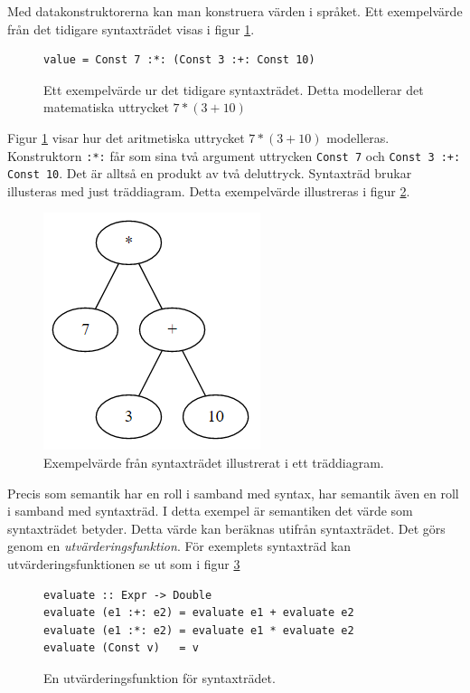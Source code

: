 \begin{draft}
Med datakonstruktorerna kan man konstruera värden i språket. Ett exempelvärde från det tidigare syntaxträdet visas i figur \ref{fig:syntax_exempel_varde}.

\begin{figure}[tph]
  \begin{lstlisting}
value = Const 7 :*: (Const 3 :+: Const 10)
  \end{lstlisting}
  \caption{Ett exempelvärde ur det tidigare syntaxträdet. Detta modellerar det matematiska uttrycket $7 * (3 + 10)$}
  \label{fig:syntax_exempel_varde}
\end{figure}

Figur \ref{fig:syntax_exempel_varde} visar hur det aritmetiska uttrycket $7 * (3 + 10)$ modelleras. Konstruktorn \texttt{:*:} får som sina två argument uttrycken \texttt{Const 7} och \texttt{Const 3 :+: Const 10}. Det är alltså en produkt av två deluttryck. Syntaxträd brukar illusteras med just träddiagram. Detta exempelvärde illustreras i figur \ref{fig:syntax_exempel_bild}.

\begin{figure}[tph]
  \centering
  \includegraphics[width=0.4\linewidth]{figure/syntax_exempel_bild.png}
  \caption{Exempelvärde från syntaxträdet illustrerat i ett träddiagram.}
  \label{fig:syntax_exempel_bild}
\end{figure}

Precis som semantik har en roll i samband med syntax, har semantik även en roll i samband med syntaxträd. I detta exempel är semantiken det värde som syntaxträdet betyder. Detta värde kan beräknas utifrån syntaxträdet. Det görs genom en \textit{utvärderingsfunktion}. För exemplets syntaxträd kan utvärderingsfunktionen se ut som i figur \ref{fig:eval_tree}

\begin{figure}[tph]
  \begin{lstlisting}
evaluate :: Expr -> Double
evaluate (e1 :+: e2) = evaluate e1 + evaluate e2
evaluate (e1 :*: e2) = evaluate e1 * evaluate e2
evaluate (Const v)   = v
  \end{lstlisting}
  \caption{En utvärderingsfunktion för syntaxträdet.}
  \label{fig:eval_tree}
\end{figure}


\end{draft}
